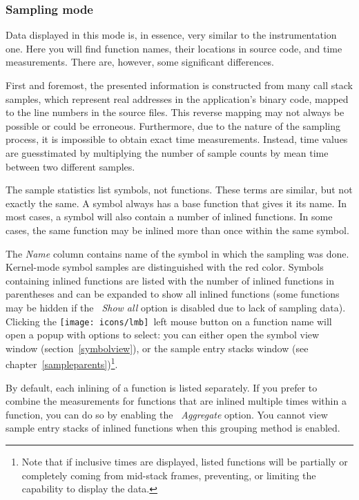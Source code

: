 \documentclass[hidelinks,titlepage,a4paper,twoside]{article}
\newcommand{\LMB}{\texttt{[image: icons/lmb]}}
\begin{document}
\subsubsection{Sampling mode}
\label{statisticssampling}

Data displayed in this mode is, in essence, very similar to the instrumentation one. Here you will find function names, their locations in source code, and time measurements. There are, however, some significant differences.

First and foremost, the presented information is constructed from many call stack samples, which represent real addresses in the application's binary code, mapped to the line numbers in the source files. This reverse mapping may not always be possible or could be erroneous. Furthermore, due to the nature of the sampling process, it is impossible to obtain exact time measurements. Instead, time values are guesstimated by multiplying the number of sample counts by mean time between two different samples.

The sample statistics list symbols, not functions. These terms are similar, but not exactly the same. A symbol always has a base function that gives it its name. In most cases, a symbol will also contain a number of inlined functions. In some cases, the same function may be inlined more than once within the same symbol.

The \emph{Name} column contains name of the symbol in which the sampling was done. Kernel-mode symbol samples are distinguished with the red color. Symbols containing inlined functions are listed with the number of inlined functions in parentheses and can be expanded to show all inlined functions (some functions may be hidden if the \emph{\faPuzzlePiece{}~Show all} option is disabled due to lack of sampling data). Clicking the \LMB{}~left mouse button on a function name will open a popup with options to select: you can either open the symbol view window (section~\ref{symbolview}), or the sample entry stacks window (see chapter~\ref{sampleparents})\footnote{Note that if inclusive times are displayed, listed functions will be partially or completely coming from mid-stack frames, preventing, or limiting the capability to display the data.}.

By default, each inlining of a function is listed separately. If you prefer to combine the measurements for functions that are inlined multiple times within a function, you can do so by enabling the \emph{\faLayerGroup{}~Aggregate} option. You cannot view sample entry stacks of inlined functions when this grouping method is enabled.
\end{document}
